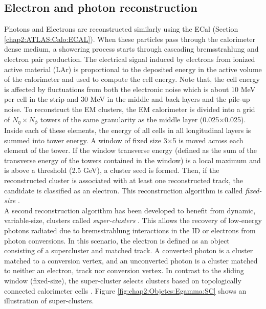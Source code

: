 \subsection{Electron and photon reconstruction}
\label{chap2:Objects:Egamma}
Photons and Electrons are reconstructed similarly using the ECal (Section \ref{chap2:ATLAS:Calo:ECAL}). When these particles pass through the calorimeter dense medium, a showering process starts through cascading bremsstrahlung and electron pair production. The electrical signal induced by electrons from ionized active material (LAr) is proportional to the deposited energy in the active volume of the calorimeter and used to compute the cell energy. Note that, the cell energy is affected by fluctuations from both the electronic noise which is about 10 MeV per cell in the strip and 30 MeV in the middle and back layers and the pile-up noise. To reconstruct the EM clusters, the EM calorimeter is divided into a grid of $N_\eta\times N_\phi$ towers of the same granularity as the middle layer (0.025$\times$0.025). Inside each of these elements, the energy of all cells in all longitudinal layers is summed into tower energy. A window of fixed size 3$\times$5 is moved across each element of the tower. If the window transverse energy \eT (defined as the sum of the transverse energy of the towers contained in the window) is a local maximum and is above a threshold (2.5 GeV), a cluster seed is formed. Then, if the reconstructed cluster is associated with at least one reconstructed track, the candidate is classified as an electron. This reconstruction algorithm is called \textit{fixed-size} \cite{Fixed_size_cluster}. \\
A second reconstruction algorithm has been developed to benefit from dynamic, variable-size, clusters called \textit{super-clusters} \cite{Egamma_Perf_run2}. This allows the recovery of low-energy photons radiated due to bremsstrahlung interactions in the ID or electrons from photon conversions. In this scenario, the electron is defined as an object consisting of a supercluster and matched track. A converted photon is a cluster matched to a conversion vertex, and an unconverted photon is a cluster matched to neither an electron, track nor conversion vertex. In contrast to the sliding window (fixed-size), the super-cluster selects clusters based on topologically connected calorimeter cells \cite{Topo_cluster}. Figure \ref{fig:chap2:Objetcs:Egamma:SC} shows an illustration of super-clusters.  
